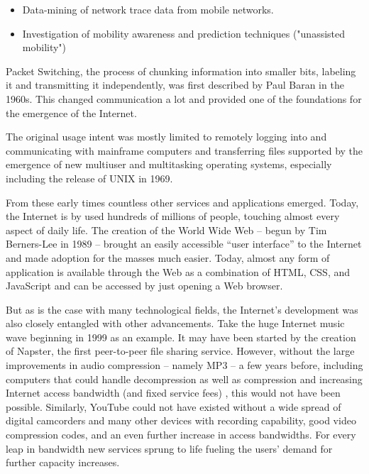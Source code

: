 \begin{itemize}
\item Data-mining of network trace data from mobile networks.
\item Investigation of mobility awareness and prediction techniques ("unassisted mobility")

\end{itemize}

Packet Switching, the process of chunking information into smaller bits, labeling it and transmitting it independently, was first described by Paul Baran in the 1960s\cite{baran1964distributed}. This changed communication a lot and provided one of the foundations for the emergence of the Internet. 

The original usage intent was mostly limited to remotely logging into and communicating with mainframe computers and transferring files supported by the emergence of new multiuser and multitasking operating systems, especially including the release of UNIX in 1969.

From these early times countless other services and applications emerged. Today, the Internet is by used hundreds of millions of people, touching almost every aspect of daily life. The creation of the World Wide Web -- begun by Tim Berners-Lee in 1989 -- brought an easily accessible ``user interface'' to the Internet and made adoption for the masses much easier. Today, almost any form of application is available through the Web as a combination of \gls{HTML}, \gls{CSS}, and JavaScript and can be accessed by just opening a Web browser.

But as is the case with many technological fields, the Internet's development was also closely entangled with other advancements. Take the huge Internet music wave beginning in 1999 as an example. It may have been started by the creation of Napster, the first peer-to-peer file sharing service. However, without the large improvements in audio compression -- namely MP3 -- a few years before, including computers that could handle decompression as well as compression and increasing Internet access bandwidth (and fixed service fees) , this would not have been possible. Similarly, YouTube could not have existed without a wide spread of digital camcorders and many other devices with recording capability, good video compression codes, and an even further increase in access bandwidths.
 For every leap in bandwidth new services sprung to life fueling the users' demand for further capacity increases. 

